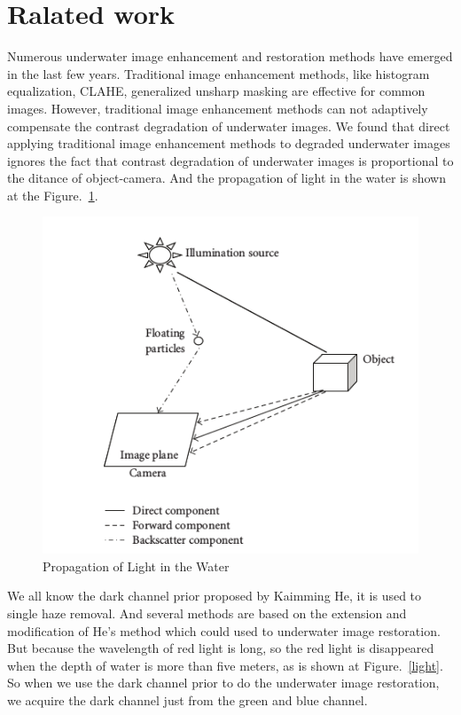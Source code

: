 \documentclass[10pt,twocolumn,letterpaper]{article}
\begin{document}
\section{Ralated work}
\par Numerous underwater image enhancement and restoration methods have emerged in the last few years. Traditional image enhancement methods, like histogram equalization, CLAHE, generalized unsharp masking are effective for common images. However, traditional image enhancement methods can not adaptively compensate the contrast degradation of underwater images. We found that direct applying traditional image enhancement methods to degraded underwater images ignores the fact that contrast degradation of underwater images is proportional to the ditance of object-camera. And the propagation of light in the water is shown at the Figure.~\ref{pro}.
\begin{figure}[htbp]
	\begin{center}
		\includegraphics[scale=0.2]{propagation.png}
	\end{center}
	\caption{Propagation of Light in the Water}
	\label{pro}
\end{figure}
\par  We all know the dark channel prior proposed by Kaimming He, it is used to single haze removal. And several methods are based on the extension and modification of He's method which could used to underwater image restoration. But because the wavelength of red light is long, so the red light is disappeared when the depth of water is more than five meters, as is shown at Figure.~\ref{light}. So when we use the dark channel prior to do the underwater image restoration, we acquire the dark channel just from the green and blue channel. 
\end{document}
